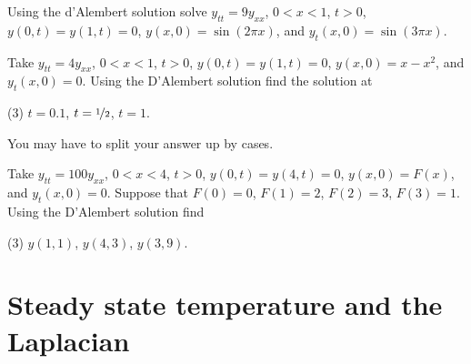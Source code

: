 \setcounter{exercise}{100}

\begin{exercise}
Using the d'Alembert solution solve $y_{tt} = 9y_{xx}$, $0 < x < 1$, $t >
0$,
$y(0,t) = y(1, t) = 0$, $y(x,0) = \sin (2 \pi x)$, and
$y_t(x,0) = \sin (3 \pi x)$.
\end{exercise}

\begin{exercise}
Take $y_{tt} = 4y_{xx}$, $0 < x < 1$, $t > 0$,
$y(0,t) = y(1, t) = 0$, $y(x,0) = x-x^2$, and
$y_t(x,0) = 0$.  Using the D'Alembert solution find
the solution at
\begin{tasks}(3)
\task $t=0.1$,
\task $t=\nicefrac{1}{2}$,
\task $t=1$.
\end{tasks}
You may have to split your answer up by cases.
\end{exercise}

\begin{exercise}
Take $y_{tt} = 100y_{xx}$, $0 < x < 4$, $t > 0$,
$y(0,t) = y(4, t) = 0$, $y(x,0) = F(x)$, and
$y_t(x,0) = 0$.  Suppose that
$F(0)=0$,
$F(1)=2$,
$F(2)=3$,
$F(3)=1$.
Using the D'Alembert solution find
\begin{tasks}(3)
\task $y(1,1)$,
\task $y(4,3)$,
\task $y(3,9)$.
\end{tasks}
\end{exercise}


\sectionnewpage
\section{Steady state temperature and the Laplacian}
\label{dirich:section}

